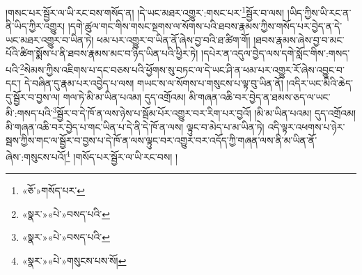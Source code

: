 །གསང་པར་སྦྱོར་ལ་ཡི་རང་བས་གསོད་ན། །དེ་ཡང་མཐར་འགྱུར་:གསང་པར་\footnote{«ཅོ་»གསོད་པར་}སྦྱོར་བ་ལས། །ཡིད་ཀྱིས་ཡི་རང་ན་ནི་ཡིད་ཀྱིར་འགྱུར། །དགེ་ཚུལ་གང་གིས་གསང་སྔགས་ལ་སོགས་པའི་ཐབས་རྣམས་ཀྱིས་གསོད་པར་བྱེད་ན་དེ་ཡང་མཐར་འགྱུར་བ་ཡིན་ཏེ། ཕམ་པར་འགྱུར་བ་ཡིན་ནོ་ཞེས་བྱ་བའི་ཐ་ཚིག་གོ། །ཐབས་རྣམས་ཞེས་བྱ་བ་མང་པོའི་ཚིག་སྨོས་པ་ནི་ཐབས་རྣམས་མང་བ་ཉིད་ཡིན་པའི་ཕྱིར་ཏེ། །དཔེར་ན་འདུལ་བྱེད་ལས་དགེ་སློང་གིས་:གསད་པའི་\footnote{«སྣར་»«པེ་»བསད་པའི་}སེམས་ཀྱིས་འཇིགས་པ་དང་བཅས་པའི་ཕྱོགས་སུ་བཏང་ལ་དེ་ཡང་ཤི་ན་ཕམ་པར་འགྱུར་རོ་ཞེས་འབྱུང་བ་དང་། དེ་བཞིན་དུ་རྣམ་པར་འབྱེད་པ་ལས། གཡང་ས་ལ་སོགས་པ་གསུངས་པ་ལྟ་བུ་ཡིན་ནོ། །འདིར་ཡང་མིའི་ཆེད་དུ་སྦྱོར་བ་བྱས་ལ། གལ་ཏེ་མི་མ་ཡིན་པའམ། དུད་འགྲོའམ། མི་གཞན་འཆི་བར་བྱེད་ན་ཐམས་ཅད་ལ་ཡང་མི་:གསད་པའི་\footnote{«སྣར་»«པེ་»བསད་པའི་}སྦྱོར་བ་དེ་ཁོ་ན་ལས་ཉེས་པ་སྦོམ་པོར་འགྱུར་བར་རིག་པར་བྱའོ། །མི་མ་ཡིན་པའམ། དུད་འགྲོའམ། མི་གཞན་འཆི་བར་བྱེད་པ་གང་ཡིན་པ་དེ་ནི་དེ་ཁོ་ན་ལས། ལྟུང་བ་མེད་པ་མ་ཡིན་ཏེ། འདི་ལྟར་འཕགས་པ་ཉེར་སྦས་ཀྱིས་གང་ལ་སྦྱོར་བ་བྱས་པ་དེ་ཁོ་ན་ལས་ལྟུང་བར་འགྱུར་བར་འདོད་ཀྱི་གཞན་ལས་ནི་མ་ཡིན་ནོ་ཞེས་:གསུངས་པའོ།\footnote{«སྣར་»«པེ་»གསུངས་པས་སོ།} །གསོད་པར་སྦྱོར་ལ་ཡི་རང་བས། །
